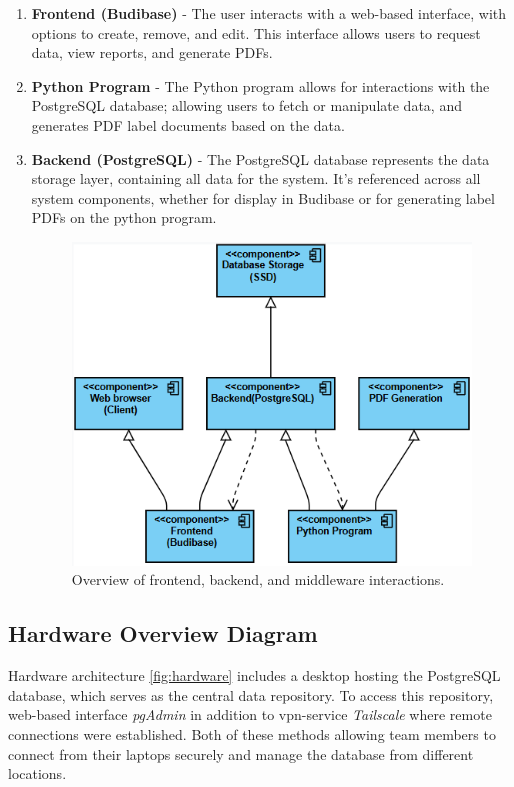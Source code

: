 \documentclass{article}
\begin{document}
\begin{enumerate} 
    \item \textbf{Frontend (Budibase)} - The user interacts with a web-based interface, with options to create, remove, and edit.  
    This interface allows users to request data, view reports, and generate PDFs.  
    \item \textbf{Python Program} - The Python program allows for interactions with the PostgreSQL database; 
    allowing users to fetch or manipulate data, and generates PDF label documents based on the data.  
    \item \textbf{Backend (PostgreSQL)} - The PostgreSQL database represents the data storage layer, containing all data for 
        the system.  
    It's referenced across all system components, whether for display in Budibase or for generating label PDFs on the python program. 

     \begin{figure}[h]
        \centering 
        \includegraphics[width=0.5\linewidth]{pictures/sys_diagram2.png} 
        \caption{Overview of frontend, backend, and middleware interactions.} 
        \label{fig:sys_diagram} 
    \end{figure} 
        \FloatBarrier
\end{enumerate} 
\subsection{Hardware Overview Diagram} 
Hardware architecture \ref{fig:hardware} includes a desktop hosting the PostgreSQL database, which serves as the central data 
repository. To access this repository, web-based interface \textit{pgAdmin} in addition to vpn-service \textit{Tailscale} where 
remote connections were established. Both of these methods allowing team members to connect from their laptops securely and 
manage the database from different locations. 
\end{document}

